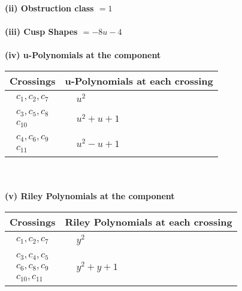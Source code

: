 \documentclass[1p]{elsarticle_modified}
\theoremstyle{definition}
\begin{document}
\flushleft \textbf{(ii) Obstruction class $= 1$}\\~\\
\flushleft \textbf{(iii) Cusp Shapes $= -8 u-4$}\\~\\
\newpage\renewcommand{\arraystretch}{1}
\flushleft \textbf{(iv) u-Polynomials at the component}\newline \\
\begin{tabular}{m{50pt}|m{274pt}}
Crossings & \hspace{64pt}u-Polynomials at each crossing \\
\hline $$\begin{aligned}c_{1},c_{2},c_{7}\end{aligned}$$&$\begin{aligned}
&u^2
\end{aligned}$\\
\hline $$\begin{aligned}c_{3},c_{5},c_{8}\\c_{10}\end{aligned}$$&$\begin{aligned}
&u^2+u+1
\end{aligned}$\\
\hline $$\begin{aligned}c_{4},c_{6},c_{9}\\c_{11}\end{aligned}$$&$\begin{aligned}
&u^2- u+1
\end{aligned}$\\
\hline
\end{tabular}\\~\\
\newpage\renewcommand{\arraystretch}{1}
\flushleft \textbf{(v) Riley Polynomials at the component}\newline \\
\begin{tabular}{m{50pt}|m{274pt}}
Crossings & \hspace{64pt}Riley Polynomials at each crossing \\
\hline $$\begin{aligned}c_{1},c_{2},c_{7}\end{aligned}$$&$\begin{aligned}
&y^2
\end{aligned}$\\
\hline $$\begin{aligned}c_{3},c_{4},c_{5}\\c_{6},c_{8},c_{9}\\c_{10},c_{11}\end{aligned}$$&$\begin{aligned}
&y^2+y+1
\end{aligned}$\\
\hline
\end{tabular}\\~\\
\end{document}
